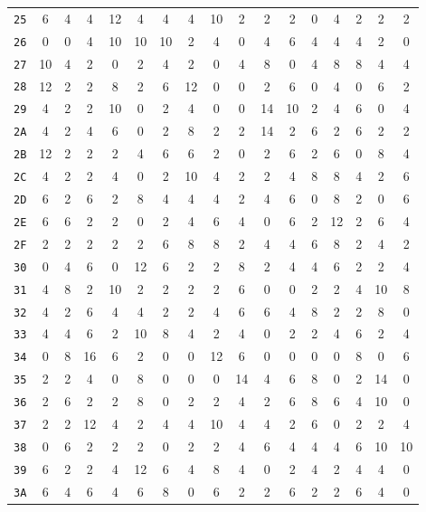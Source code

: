 \begin{center}
\begin{small}
\begin{longtable}{c|cccccccccccccccc}
\texttt{25} & 6 & 4 & 4 & 12 & 4 & 4 & 4 & 10 & 2 & 2 & 2 & 0 & 4 & 2 & 2 & 2 \\
\texttt{26} & 0 & 0 & 4 & 10 & 10 & 10 & 2 & 4 & 0 & 4 & 6 & 4 & 4 & 4 & 2 & 0 \\
\texttt{27} & 10 & 4 & 2 & 0 & 2 & 4 & 2 & 0 & 4 & 8 & 0 & 4 & 8 & 8 & 4 & 4 \\
\texttt{28} & 12 & 2 & 2 & 8 & 2 & 6 & 12 & 0 & 0 & 2 & 6 & 0 & 4 & 0 & 6 & 2 \\
\texttt{29} & 4 & 2 & 2 & 10 & 0 & 2 & 4 & 0 & 0 & 14 & 10 & 2 & 4 & 6 & 0 & 4 \\
\texttt{2A} & 4 & 2 & 4 & 6 & 0 & 2 & 8 & 2 & 2 & 14 & 2 & 6 & 2 & 6 & 2 & 2 \\
\texttt{2B} & 12 & 2 & 2 & 2 & 4 & 6 & 6 & 2 & 0 & 2 & 6 & 2 & 6 & 0 & 8 & 4 \\
\texttt{2C} & 4 & 2 & 2 & 4 & 0 & 2 & 10 & 4 & 2 & 2 & 4 & 8 & 8 & 4 & 2 & 6 \\
\texttt{2D} & 6 & 2 & 6 & 2 & 8 & 4 & 4 & 4 & 2 & 4 & 6 & 0 & 8 & 2 & 0 & 6 \\
\texttt{2E} & 6 & 6 & 2 & 2 & 0 & 2 & 4 & 6 & 4 & 0 & 6 & 2 & 12 & 2 & 6 & 4 \\
\texttt{2F} & 2 & 2 & 2 & 2 & 2 & 6 & 8 & 8 & 2 & 4 & 4 & 6 & 8 & 2 & 4 & 2 \\
\texttt{30} & 0 & 4 & 6 & 0 & 12 & 6 & 2 & 2 & 8 & 2 & 4 & 4 & 6 & 2 & 2 & 4 \\
\texttt{31} & 4 & 8 & 2 & 10 & 2 & 2 & 2 & 2 & 6 & 0 & 0 & 2 & 2 & 4 & 10 & 8 \\
\texttt{32} & 4 & 2 & 6 & 4 & 4 & 2 & 2 & 4 & 6 & 6 & 4 & 8 & 2 & 2 & 8 & 0 \\
\texttt{33} & 4 & 4 & 6 & 2 & 10 & 8 & 4 & 2 & 4 & 0 & 2 & 2 & 4 & 6 & 2 & 4 \\
\texttt{34} & 0 & 8 & 16 & 6 & 2 & 0 & 0 & 12 & 6 & 0 & 0 & 0 & 0 & 8 & 0 & 6 \\
\texttt{35} & 2 & 2 & 4 & 0 & 8 & 0 & 0 & 0 & 14 & 4 & 6 & 8 & 0 & 2 & 14 & 0 \\
\texttt{36} & 2 & 6 & 2 & 2 & 8 & 0 & 2 & 2 & 4 & 2 & 6 & 8 & 6 & 4 & 10 & 0 \\
\texttt{37} & 2 & 2 & 12 & 4 & 2 & 4 & 4 & 10 & 4 & 4 & 2 & 6 & 0 & 2 & 2 & 4 \\
\texttt{38} & 0 & 6 & 2 & 2 & 2 & 0 & 2 & 2 & 4 & 6 & 4 & 4 & 4 & 6 & 10 & 10 \\
\texttt{39} & 6 & 2 & 2 & 4 & 12 & 6 & 4 & 8 & 4 & 0 & 2 & 4 & 2 & 4 & 4 & 0 \\
\texttt{3A} & 6 & 4 & 6 & 4 & 6 & 8 & 0 & 6 & 2 & 2 & 6 & 2 & 2 & 6 & 4 & 0 \\

\end{longtable}
\end{small}
\end{center}
